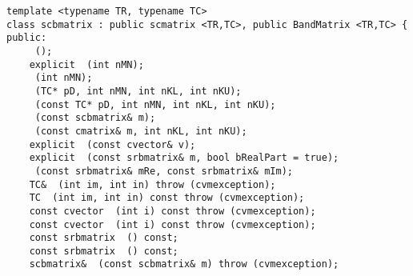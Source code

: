 \bigskip
\noindent
\verb"template <typename TR, typename TC>"\\
\verb"class scbmatrix : public scmatrix <TR,TC>, public BandMatrix <TR,TC> {"\\
\verb"public:"\\
\verb"    "\verb" ();"\\
\verb"    explicit "\verb" (int nMN);"\\
\verb"    "\verb" (int nMN);"\\
\verb"    "\verb" (TC* pD, int nMN, int nKL, int nKU);"\\
\verb"    "\verb" (const TC* pD, int nMN, int nKL, int nKU);"\\
\verb"    "\verb" (const scbmatrix& m);"\\
\verb"    "\verb" (const cmatrix& m, int nKL, int nKU);"\\
\verb"    explicit "\verb" (const cvector& v);"\\
\verb"    explicit "\verb" (const srbmatrix& m, bool bRealPart = true);"\\
\verb"    "\verb" (const srbmatrix& mRe, const srbmatrix& mIm);"\\
\verb"    TC& "\verb" (int im, int in) throw (cvmexception);"\\
\verb"    TC "\verb" (int im, int in) const throw (cvmexception);"\\
\verb"    const cvector "\verb" (int i) const throw (cvmexception);"\\
\verb"    const cvector "\verb" (int i) const throw (cvmexception);"\\
\verb"    const srbmatrix "\verb" () const;"\\
\verb"    const srbmatrix "\verb" () const;"\\
\verb"    scbmatrix& "\verb" (const scbmatrix& m) throw (cvmexception);"\\
